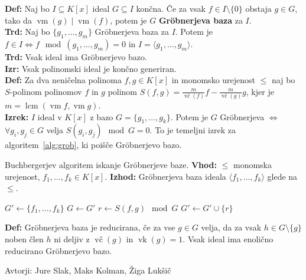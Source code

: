 \documentclass[a4paper,oneside,10pt]{article}
\theoremstyle{definition}
\newcommand{\vk}{\operatorname{vk}}
\newcommand{\vc}{\operatorname{\text{vč}}}
\newcommand{\vm}{\operatorname{vm}}
\let\oldtextbf\textbf
\renewcommand{\textbf}[1]{\oldtextbf{\boldmath #1}}
\begin{document}
\textbf{Def: } Naj bo $I \subseteq K[x]$ ideal $G\subseteq I$ končna.
Če za vsak $f \in I \setminus \{0\}$ obstaja $g \in G$, tako da $\vm(g) \mid \vm(f)$, potem je $G$ \textbf{Gr\"obnerjeva baza} za $I$.  \\
\textbf{Trd: } Naj bo $\{g_1, \ldots, g_m\}$ Gr\"obnerjeva baza za $I$.
Potem je $f \in I \iff f \mod (g_1, \ldots, g_m) = 0$ in $I = \langle g_1, \dots, g_m\rangle$. \\
\textbf{Trd:} Vsak ideal ima Gr\"obnerjevo bazo. \\
\textbf{Izr:} Vsak polinomski ideal je končno generiran. \\
\textbf{Def:} Za dva neničelna polinoma $f, g \in K[x]$ in monomsko urejenost $\leq$ naj bo $S$-polinom polinomov $f$ in $g$ polinom
$S(f, g) = \frac{m}{\vc(f)} f - \frac{m}{\vc(g)}g$, kjer je $m = \operatorname{lcm}(\vm f, \vm g)$. \\
\textbf{Izrek:} $I$ ideal v $K[x]$ z bazo $G = \{g_1, \ldots, g_k\}$.
Potem je $G$ Gr\"obnerjeva $\iff$ $\forall g_i, g_j \in G$ velja $S(g_i, g_j) \mod G = 0$. To je temeljni izrek za algoritem~\ref{alg:grob}, ki poišče Gr\"obnerjevo bazo.

\begin{algorithm}[!ht]
\caption{Buchbergerjev algoritem iskanje Gr\"obnerjeve baze. \newline
\textbf{Vhod:} $\leq$ monomska urejenost, $f_1, \ldots, f_k \in K[x]$. \newline
\textbf{Izhod:} Gr\"obnerjeva baza ideala $\langle f_1, \dots, f_k\rangle$ glede na $\leq$.}
\label{alg:grob}
\begin{algorithmic}[1]
\State $G' \gets \{f_1, \ldots, f_k\}$
\Repeat
    \State $G \gets G'$
        \State $r\gets S(f, g) \mod G$
            \State $G' \gets G' \cup \{r\}$
        \EndIf
    \EndFor
{}
\EndProcedure
\end{algorithmic}
\end{algorithm}

\textbf{Def:} Gr\"obnerjeva baza je reducirana, če za vse $g \in G$ velja, da za vsak $h \in G \setminus \{g\}$ noben člen $h$ ni deljiv
z $\vc(g)$ in $\vk(g) = 1$. Vsak ideal ima enolično reducirano Gr\"obnerjevo bazo.

\hfill Avtorji: Jure Slak, Maks Kolman, Žiga Lukšič
\end{document}
